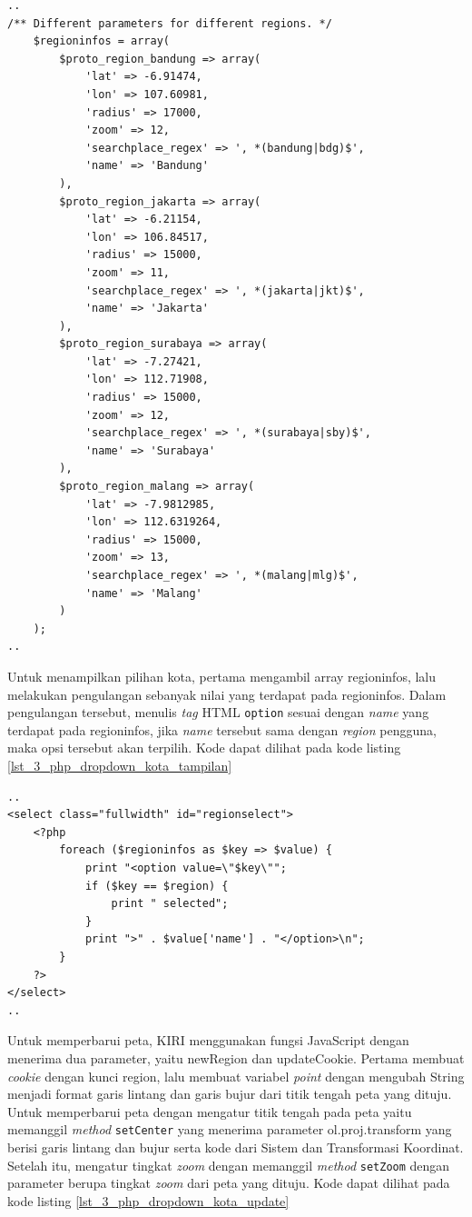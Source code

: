 \begin{lstlisting}[caption=Deklarasi variabel regioninfos,label = {lst_3_php_dropdown_kota_regioninfos}]
..
/** Different parameters for different regions. */
	$regioninfos = array(
		$proto_region_bandung => array(
			'lat' => -6.91474,
			'lon' => 107.60981,
			'radius' => 17000,
			'zoom' => 12,
			'searchplace_regex' => ', *(bandung|bdg)$',
			'name' => 'Bandung'
		),
		$proto_region_jakarta => array(
			'lat' => -6.21154,
			'lon' => 106.84517,
			'radius' => 15000,
			'zoom' => 11,
			'searchplace_regex' => ', *(jakarta|jkt)$',
			'name' => 'Jakarta'
		),
		$proto_region_surabaya => array(
			'lat' => -7.27421,
			'lon' => 112.71908,
			'radius' => 15000,
			'zoom' => 12,
			'searchplace_regex' => ', *(surabaya|sby)$',
			'name' => 'Surabaya'
		),
		$proto_region_malang => array(
			'lat' => -7.9812985,
			'lon' => 112.6319264,
			'radius' => 15000,
			'zoom' => 13,
			'searchplace_regex' => ', *(malang|mlg)$',
			'name' => 'Malang'				
		)
	);
..
\end{lstlisting}

Untuk menampilkan pilihan kota, pertama mengambil array regioninfos, lalu melakukan pengulangan sebanyak nilai yang terdapat pada regioninfos. Dalam pengulangan tersebut, menulis \textit{tag} HTML \verb!option! sesuai dengan \textit{name} yang terdapat pada regioninfos, jika \textit{name} tersebut sama dengan \textit{region} pengguna, maka opsi tersebut akan terpilih. Kode dapat dilihat pada kode listing \ref{lst_3_php_dropdown_kota_tampilan}

\begin{lstlisting}[caption=Menampilkan pilihan kota kepada pengguna ,label = {lst_3_php_dropdown_kota_tampilan}]
..
<select class="fullwidth" id="regionselect">
	<?php
		foreach ($regioninfos as $key => $value) {
			print "<option value=\"$key\"";
			if ($key == $region) {
				print " selected";
			}
			print ">" . $value['name'] . "</option>\n";
		}
	?>
</select>
..
\end{lstlisting}

Untuk memperbarui peta, KIRI menggunakan fungsi JavaScript dengan menerima dua parameter, yaitu newRegion dan updateCookie. Pertama membuat \textit{cookie} dengan kunci region, lalu membuat variabel \textit{point} dengan mengubah String menjadi format garis lintang dan garis bujur dari titik tengah peta yang dituju. Untuk memperbarui peta dengan mengatur titik tengah pada peta yaitu memanggil \textit{method} \verb!setCenter! yang menerima parameter ol.proj.transform yang berisi garis lintang dan bujur serta kode dari Sistem  dan Transformasi  Koordinat. Setelah itu, mengatur tingkat \textit{zoom} dengan memanggil \textit{method} \verb!setZoom! dengan parameter berupa tingkat \textit{zoom} dari peta yang dituju. Kode dapat dilihat pada kode listing \ref{lst_3_php_dropdown_kota_update}

